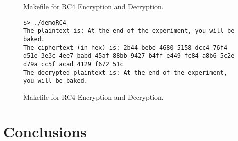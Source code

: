 \documentclass{article}
\begin{document}
\begin{figure}
\begin{mdframed}

\end{mdframed}
\caption{Makefile for RC4 Encryption and Decryption.}
\label{fig:step2bb}
\end{figure}

\begin{figure}
\begin{mdframed}
\begin{lstlisting}
$> ./demoRC4
The plaintext is: At the end of the experiment, you will be baked.
The ciphertext (in hex) is: 2b44 bebe 4680 5158 dcc4 76f4 d51e 3e3c 4ee7 babd 45af 88bb 9427 b4ff e449 fc84 a8b6 5c2e d79a cc5f acad 4129 f672 51c
The decrypted plaintext is: At the end of the experiment, you will be baked.
\end{lstlisting}
\end{mdframed}
\caption{Makefile for RC4 Encryption and Decryption.}
\label{fig:step2bc}
\end{figure}


\section{Conclusions}
\end{document}
